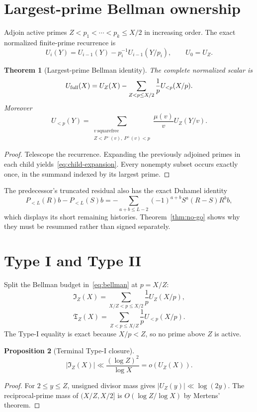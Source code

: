 \documentclass[11pt]{article}
\newtheorem{theorem}{Theorem}[section]
\newtheorem{proposition}[theorem]{Proposition}
\newcommand{\1}{\mathbf 1}
\begin{document}
\section{Largest-prime Bellman ownership}
Adjoin active primes $Z<p_1<\cdots<p_k\le X/2$ in increasing order.  The exact
normalized finite-prime recurrence is
\[
 U_i(Y)=U_{i-1}(Y)-p_i^{-1}U_{i-1}(Y/p_i),\qquad U_0=U_Z.
\]

\begin{theorem}[Largest-prime Bellman identity]\label{thm:bellman}
The complete normalized scalar is
\begin{equation}\label{eq:bellman}
 U_{\rm full}(X)=U_Z(X)-
 \sum_{Z<p\le X/2}\frac1pU_{<p}(X/p).
\end{equation}
Moreover
\begin{equation}\label{eq:child-expansion}
 U_{<p}(Y)=
 \sum_{\substack{v\ \mathrm{squarefree}\\Z<P^-(v),\ P^+(v)<p}}
 \frac{\mu(v)}vU_Z(Y/v).
\end{equation}
\end{theorem}
\begin{proof}
Telescope the recurrence.  Expanding the previously adjoined primes in each
child yields~\eqref{eq:child-expansion}.  Every nonempty subset occurs exactly
once, in the summand indexed by its largest prime.
\end{proof}

The predecessor's truncated residual also has the exact Duhamel identity
\[
 P_{<L}(R)b-P_{<L}(S)b
 =-\sum_{a+b\le L-2}(-1)^{a+b}S^a(R-S)R^b b,
\]
which displays its short remaining histories.  Theorem~\ref{thm:no-go} shows
why they must be resummed rather than signed separately.

\section{Type I and Type II}
Split the Bellman budget in~\eqref{eq:bellman} at $p=X/Z$:
\[
 \mathfrak I_Z(X)=\sum_{X/Z<p\le X/2}\frac1pU_Z(X/p),
\]
\[
 \mathfrak T_Z(X)=\sum_{Z<p\le X/Z}\frac1pU_{<p}(X/p).
\]
The Type-I equality is exact because $X/p<Z$, so no prime above $Z$ is active.

\begin{proposition}[Terminal Type-I closure]\label{prop:typei}
\[
 |\mathfrak I_Z(X)|\ll\frac{(\log Z)^2}{\log X}=o(U_Z(X)).
\]
\end{proposition}
\begin{proof}
For $2\le y\le Z$, unsigned divisor mass gives
$|U_Z(y)|\ll\log(2y)$.  The reciprocal-prime mass of
$(X/Z,X/2]$ is $O(\log Z/\log X)$ by Mertens' theorem.
\end{proof}
\end{document}
